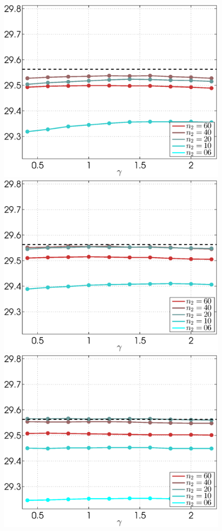 \documentclass{ipol}
\begin{document}
\begin{figure}[ht!]
	\includegraphics[width=.2\textwidth]{f/nldct/WIE1mu3WIE2-vs-WIE1WIE2_fpsnr_np2-g-curves_1np030_s40_average.eps}%
	\includegraphics[width=.2\textwidth]{f/nldct/WIE1mu3WIE2-vs-WIE1WIE2_fpsnr_np2-g-curves_1np040_s40_average.eps}%
	\includegraphics[width=.2\textwidth]{f/nldct/WIE1mu3WIE2-vs-WIE1WIE2_fpsnr_np2-g-curves_1np100_s40_average.eps}\\
                                         

\end{figure}
\end{document}

